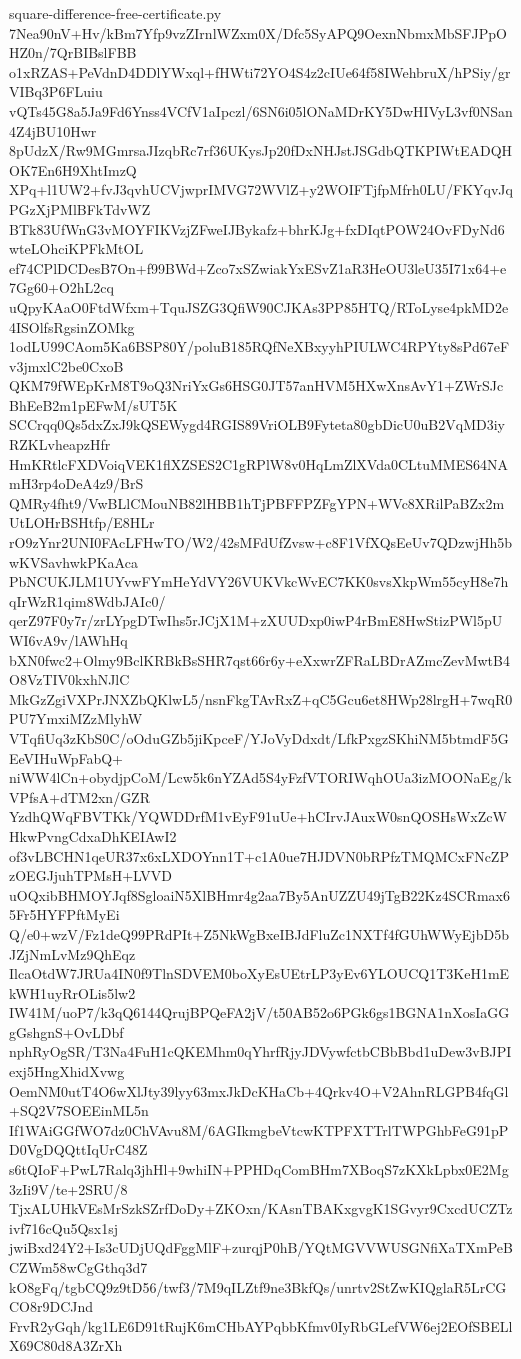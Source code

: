 \documentclass[11pt]{article}
\theoremstyle{definition}
\theoremstyle{remark}
\begin{document}
\begin{filecontents*}[overwrite]{square-difference-free-certificate.py}
7Nea90nV+Hv/kBm7Yfp9vzZIrnlWZxm0X/Dfc5SyAPQ9OexnNbmxMbSFJPpOHZ0n/7QrBIBslFBB
o1xRZAS+PeVdnD4DDlYWxql+fHWti72YO4S4z2cIUe64f58IWehbruX/hPSiy/grVIBq3P6FLuiu
vQTs45G8a5Ja9Fd6Ynss4VCfV1aIpczl/6SN6i05lONaMDrKY5DwHIVyL3vf0NSan4Z4jBU10Hwr
8pUdzX/Rw9MGmrsaJIzqbRc7rf36UKysJp20fDxNHJstJSGdbQTKPIWtEADQHOK7En6H9XhtImzQ
XPq+l1UW2+fvJ3qvhUCVjwprIMVG72WVlZ+y2WOIFTjfpMfrh0LU/FKYqvJqPGzXjPMlBFkTdvWZ
BTk83UfWnG3vMOYFIKVzjZFweIJBykafz+bhrKJg+fxDIqtPOW24OvFDyNd6wteLOhciKPFkMtOL
ef74CPlDCDesB7On+f99BWd+Zco7xSZwiakYxESvZ1aR3HeOU3leU35I71x64+e7Gg60+O2hL2cq
uQpyKAaO0FtdWfxm+TquJSZG3QfiW90CJKAs3PP85HTQ/RToLyse4pkMD2e4ISOlfsRgsinZOMkg
1odLU99CAom5Ka6BSP80Y/poluB185RQfNeXBxyyhPIULWC4RPYty8sPd67eFv3jmxlC2be0CxoB
QKM79fWEpKrM8T9oQ3NriYxGs6HSG0JT57anHVM5HXwXnsAvY1+ZWrSJcBhEeB2m1pEFwM/sUT5K
SCCrqq0Qs5dxZxJ9kQSEWygd4RGIS89VriOLB9Fyteta80gbDicU0uB2VqMD3iyRZKLvheapzHfr
HmKRtlcFXDVoiqVEK1flXZSES2C1gRPlW8v0HqLmZlXVda0CLtuMMES64NAmH3rp4oDeA4z9/BrS
QMRy4fht9/VwBLlCMouNB82lHBB1hTjPBFFPZFgYPN+WVc8XRilPaBZx2mUtLOHrBSHtfp/E8HLr
rO9zYnr2UNI0FAcLFHwTO/W2/42sMFdUfZvsw+c8F1VfXQsEeUv7QDzwjHh5bwKVSavhwkPKaAca
PbNCUKJLM1UYvwFYmHeYdVY26VUKVkcWvEC7KK0svsXkpWm55cyH8e7hqIrWzR1qim8WdbJAIc0/
qerZ97F0y7r/zrLYpgDTwIhs5rJCjX1M+zXUUDxp0iwP4rBmE8HwStizPWl5pUWI6vA9v/lAWhHq
bXN0fwc2+Olmy9BclKRBkBsSHR7qst66r6y+eXxwrZFRaLBDrAZmcZevMwtB4O8VzTIV0kxhNJlC
MkGzZgiVXPrJNXZbQKlwL5/nsnFkgTAvRxZ+qC5Gcu6et8HWp28lrgH+7wqR0PU7YmxiMZzMlyhW
VTqfiUq3zKbS0C/oOduGZb5jiKpceF/YJoVyDdxdt/LfkPxgzSKhiNM5btmdF5GEeVIHuWpFabQ+
niWW4lCn+obydjpCoM/Lcw5k6nYZAd5S4yFzfVTORIWqhOUa3izMOONaEg/kVPfsA+dTM2xn/GZR
YzdhQWqFBVTKk/YQWDDrfM1vEyF91uUe+hCIrvJAuxW0snQOSHsWxZcWHkwPvngCdxaDhKEIAwI2
of3vLBCHN1qeUR37x6xLXDOYnn1T+c1A0ue7HJDVN0bRPfzTMQMCxFNcZPzOEGJjuhTPMsH+LVVD
uOQxibBHMOYJqf8SgloaiN5XlBHmr4g2aa7By5AnUZZU49jTgB22Kz4SCRmax65Fr5HYFPftMyEi
Q/e0+wzV/Fz1deQ99PRdPIt+Z5NkWgBxeIBJdFluZc1NXTf4fGUhWWyEjbD5bJZjNmLvMz9QhEqz
IlcaOtdW7JRUa4IN0f9TlnSDVEM0boXyEsUEtrLP3yEv6YLOUCQ1T3KeH1mEkWH1uyRrOLis5lw2
IW41M/uoP7/k3qQ6144QrujBPQeFA2jV/t50AB52o6PGk6gs1BGNA1nXosIaGGgGshgnS+OvLDbf
nphRyOgSR/T3Na4FuH1cQKEMhm0qYhrfRjyJDVywfctbCBbBbd1uDew3vBJPIexj5HngXhidXvwg
OemNM0utT4O6wXlJty39lyy63mxJkDcKHaCb+4Qrkv4O+V2AhnRLGPB4fqGl+SQ2V7SOEEinML5n
If1WAiGGfWO7dz0ChVAvu8M/6AGIkmgbeVtcwKTPFXTTrlTWPGhbFeG91pPD0VgDQQttIqUrC48Z
s6tQIoF+PwL7Ralq3jhHl+9whiIN+PPHDqComBHm7XBoqS7zKXkLpbx0E2Mg3zIi9V/te+2SRU/8
TjxALUHkVEsMrSzkSZrfDoDy+ZKOxn/KAsnTBAKxgvgK1SGvyr9CxcdUCZTzivf716cQu5Qsx1sj
jwiBxd24Y2+Is3cUDjUQdFggMlF+zurqjP0hB/YQtMGVVWUSGNfiXaTXmPeBCZWm58wCgGthq3d7
kO8gFq/tgbCQ9z9tD56/twf3/7M9qILZtf9ne3BkfQs/unrtv2StZwKIQglaR5LrCGCO8r9DCJnd
FrvR2yGqh/kg1LE6D91tRujK6mCHbAYPqbbKfmv0IyRbGLefVW6ej2EOfSBELlX69C80d8A3ZrXh

\end{filecontents*}
\end{document}
